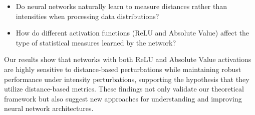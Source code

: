 \begin{itemize}
    \item Do neural networks naturally learn to measure distances rather than intensities when processing data distributions?
    \item How do different activation functions (ReLU and Absolute Value) affect the type of statistical measures learned by the network?
\end{itemize}

Our results show that networks with both ReLU and Absolute Value activations are highly sensitive to distance-based perturbations while maintaining robust performance under intensity perturbations, supporting the hypothesis that they utilize distance-based metrics. These findings not only validate our theoretical framework but also suggest new approaches for understanding and improving neural network architectures.
